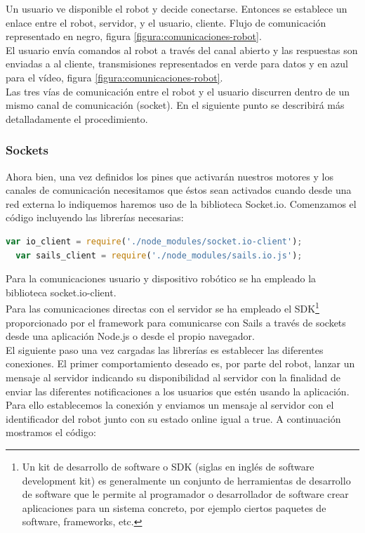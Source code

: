 Un usuario ve disponible el robot y decide conectarse. Entonces se establece un enlace entre el robot, servidor, y el usuario, cliente. Flujo de comunicación representado en negro, figura \ref{figura:comunicaciones-robot}.\\

El usuario envía comandos al robot a través del canal abierto y las respuestas son enviadas a al cliente, transmisiones representados en verde para datos y en azul para el vídeo, figura \ref{figura:comunicaciones-robot}.\\

Las tres vías de comunicación entre el robot y el usuario discurren dentro de un mismo canal de comunicación (socket). En el siguiente punto se describirá más detalladamente el procedimiento.


\subsubsection{Sockets}

Ahora bien, una vez definidos los pines que activarán nuestros motores y los canales de comunicación necesitamos que éstos sean activados cuando desde una red externa lo indiquemos haremos uso
de la biblioteca Socket.io. Comenzamos el código incluyendo las librerías necesarias:

\begin{lstlisting}[language=JavaScript]
  var io_client = require('./node_modules/socket.io-client');
  var sails_client = require('./node_modules/sails.io.js');
\end{lstlisting}

Para la comunicaciones usuario y dispositivo robótico se ha empleado la biblioteca socket.io-client.\\

Para las comunicaciones directas con el servidor se ha empleado el SDK\footnote{Un kit de desarrollo de software o SDK (siglas en inglés de software development kit) es generalmente un conjunto de herramientas
de desarrollo de software que le permite al programador o desarrollador de software crear aplicaciones para un sistema concreto, por ejemplo ciertos paquetes de software, frameworks, etc.} proporcionado por el framework
para comunicarse con Sails a través de sockets desde una aplicación Node.js o desde el propio navegador.\\


El siguiente paso una vez cargadas las librerías es establecer las diferentes conexiones. El primer comportamiento deseado es, por parte del robot, lanzar un mensaje al servidor indicando su disponibilidad al servidor con la finalidad de
enviar las diferentes notificaciones a los usuarios que estén usando la aplicación. Para ello establecemos la conexión y enviamos un mensaje al servidor con el identificador del robot junto con su estado online igual a true. A continuación mostramos
el código:\\

